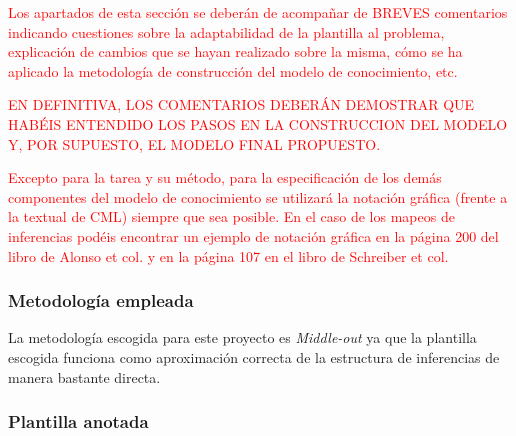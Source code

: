 \documentclass[12pt,a4paper,twoside,spanish]{article}      %
\begin{document}
\textcolor {red} {Los apartados de esta sección  se deberán de acompañar de BREVES comentarios indicando cuestiones sobre la adaptabilidad de la plantilla al problema, explicación de cambios que se hayan realizado sobre la misma, cómo se ha aplicado la metodología de construcción del modelo de conocimiento, etc.}

\textcolor {red} {EN DEFINITIVA, LOS COMENTARIOS DEBERÁN DEMOSTRAR QUE HABÉIS ENTENDIDO LOS PASOS EN LA CONSTRUCCION DEL MODELO Y, POR SUPUESTO, EL MODELO FINAL PROPUESTO.}

\textcolor {red} {Excepto para la tarea y su método, para la especificación de los demás componentes del modelo de conocimiento se utilizará la notación gráfica (frente a la textual de CML) siempre que sea posible. En el caso de los mapeos de inferencias podéis encontrar un ejemplo de notación gráfica en la página 200 del libro de Alonso et col. y en la página 107 en el libro de Schreiber et col.}


\subsubsection{Metodología empleada}
La metodología escogida para este proyecto es \textit{Middle-out} ya que la plantilla escogida funciona como aproximación correcta de la estructura de inferencias de manera bastante directa.


\subsubsection{Plantilla anotada}
\end{document}
